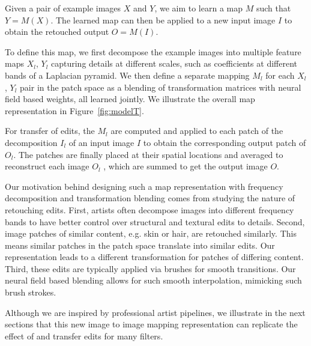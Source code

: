 Given a pair of example images $X$ and $Y$, we aim to learn a map $M$ such that $Y = M(X)$. The learned map can then be applied to a new input image $I$ to obtain the retouched output $O = M(I)$. 

To define this map, we first decompose the example images into multiple feature maps $X_l$, $Y_l$ capturing details at different scales, such as coefficients at different bands of a Laplacian pyramid. We then define a separate mapping $M_l$ for each $X_l$, $Y_l$ pair in the patch space as a blending of transformation matrices with neural field based weights, all learned jointly. We illustrate the overall map representation in Figure~\ref{fig:modelT}.


For transfer of edits, the $M_l$ are computed and applied to each patch of the decomposition $I_l$ of an input image $I$ to obtain the corresponding output patch of $O_l$. The patches are finally placed at their spatial locations and averaged to reconstruct each image $O_l$ , which are summed to get the output image $O$.

Our motivation behind designing such a map representation with frequency decomposition and transformation blending comes from studying the nature of retouching edits. First, artists often decompose images into different frequency bands to have better control over structural and textural edits to details. Second, image patches of similar content, e.g. skin or hair, are retouched similarly. This means similar patches in the patch space translate into similar edits. Our representation leads to a different transformation for patches of differing content. Third, these edits are typically applied via brushes for smooth transitions. Our neural field based blending allows for such smooth interpolation, mimicking such brush strokes.

Although we are inspired by professional artist pipelines, we illustrate in the next sections that this new image to image mapping representation can replicate the effect of and transfer edits for many filters.
